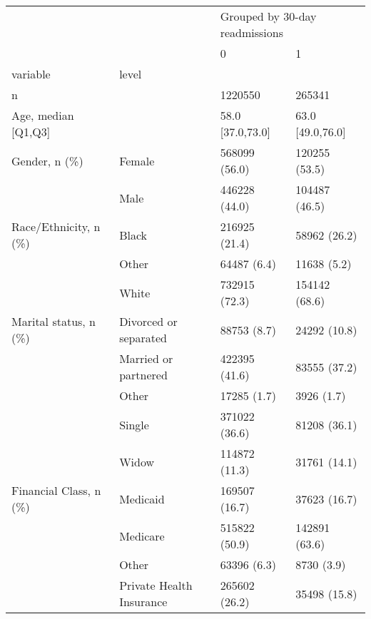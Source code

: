\begin{tabular}{llll}
\toprule
                                       &   & \multicolumn{2}{l}{Grouped by 30-day readmissions} \\
                                       &   &                              0 &                 1 \\
variable & level &                                &                   \\
\midrule
n &   &                        1220550 &            265341 \\
Age, median [Q1,Q3] &   &               58.0 [37.0,73.0] &  63.0 [49.0,76.0] \\
Gender, n (\%) & Female &                  568099 (56.0) &     120255 (53.5) \\
                                       & Male &                  446228 (44.0) &     104487 (46.5) \\
Race/Ethnicity, n (\%) & Black &                  216925 (21.4) &      58962 (26.2) \\
                                       & Other &                    64487 (6.4) &       11638 (5.2) \\
                                       & White &                  732915 (72.3) &     154142 (68.6) \\
Marital status, n (\%) & Divorced or separated &                    88753 (8.7) &      24292 (10.8) \\
                                       & Married or partnered &                  422395 (41.6) &      83555 (37.2) \\
                                       & Other &                    17285 (1.7) &        3926 (1.7) \\
                                       & Single &                  371022 (36.6) &      81208 (36.1) \\
                                       & Widow &                  114872 (11.3) &      31761 (14.1) \\
Financial Class, n (\%) & Medicaid &                  169507 (16.7) &      37623 (16.7) \\
                                       & Medicare &                  515822 (50.9) &     142891 (63.6) \\
                                       & Other &                    63396 (6.3) &        8730 (3.9) \\
                                       & Private Health Insurance &                  265602 (26.2) &      35498 (15.8) \\

\end{tabular}
